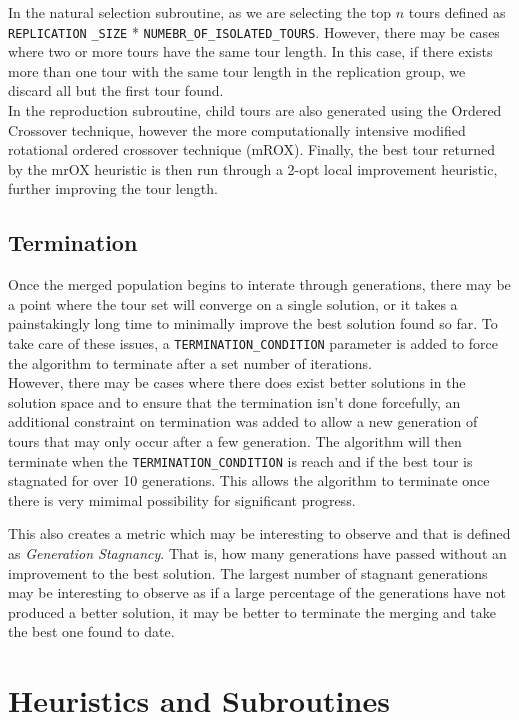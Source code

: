 \documentclass[12pt]{article}
\begin{document}
In the natural selection subroutine, as we are selecting the top $n$ tours defined as \verb|REPLICATION|
\verb|_SIZE| * \verb|NUMEBR_OF_ISOLATED_TOURS|. However, there may be cases where two or more tours have the same tour length. In this case, if there exists more than one tour with the same tour length in the replication group, we discard all but the first tour found.\\

In the reproduction subroutine, child tours are also generated using the Ordered Crossover technique, however the more computationally intensive modified rotational ordered crossover technique (mROX). Finally, the best tour returned by the mrOX heuristic is then run through a 2-opt local improvement heuristic, further improving the tour length. 

\subsection{Termination} 

Once the merged population begins to interate through generations, there may be a point where the tour set will converge on a single solution, or it takes a painstakingly long time to minimally improve the best solution found so far. To take care of these issues, a \verb|TERMINATION_CONDITION| parameter is added to force the algorithm to terminate after a set number of iterations.\\

However, there may be cases where there does exist better solutions in the solution space and to ensure that the termination isn't done forcefully, an additional constraint on termination was added to allow a new generation of tours that may only occur after a few generation. The algorithm will then terminate when the \verb|TERMINATION_CONDITION| is reach and if the best tour is stagnated for over 10 generations. This allows the algorithm to terminate once there is very mimimal possibility for significant progress.

This also creates a metric which may be interesting to observe and that is defined as \textit{Generation Stagnancy}. That is, how many generations have passed without an improvement to the best solution. The largest number of stagnant generations may be interesting to observe as if a large percentage of the generations have not produced a better solution, it may be better to terminate the merging and take the best one found to date.

\section{Heuristics and Subroutines}
\end{document}
